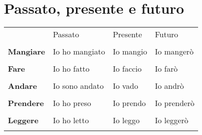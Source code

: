 \documentclass[letter,11pt]{article}
\begin{document}
\vskip 0.2in
\section*{Passato, presente e futuro}
\vskip 0.2in

\begin{tabular}{ |p{3cm} |p{3cm}| p{3cm}| p{3cm}| }
    \hline
    \hline
    & Passato & Presente  & Futuro   \\
     & &   &   \\ \hline
     \hline
    {\bf Mangiare} & Io ho mangiato  &  Io mangio  & Io mangerò   \\
     &  &   &   \\ \hline
    {\bf Fare } &  Io ho fatto     & Io faccio   & Io farò      \\
     &  &   &   \\ \hline
    {\bf Andare} & Io sono andato  & Io vado     & Io andrò     \\
     &  &   &   \\ \hline
     {\bf Prendere} & Io ho preso     & Io prendo   & Io prenderò     \\
    &  &   &   \\ \hline
    {\bf Leggere} & Io ho letto     & Io leggo    & Io leggerò     \\
    &  &   &   \\ \hline
    \hline
\end{tabular}
\end{document}
